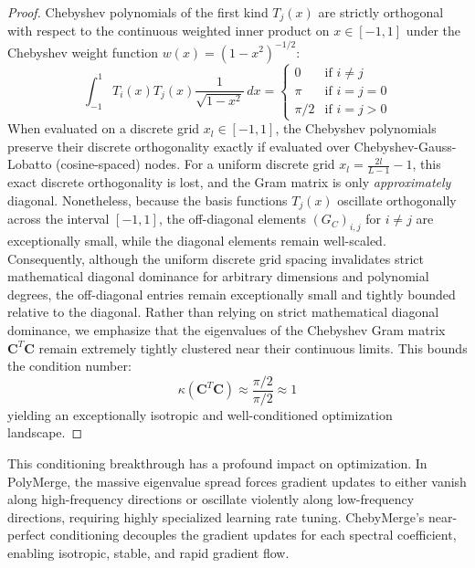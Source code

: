 \begin{proof}
Chebyshev polynomials of the first kind $T_j(x)$ are strictly orthogonal with respect to the continuous weighted inner product on $x \in [-1, 1]$ under the Chebyshev weight function $w(x) = (1 - x^2)^{-1/2}$:
\begin{equation}
\int_{-1}^1 T_i(x) T_j(x) \frac{1}{\sqrt{1-x^2}} \, dx = \begin{cases} 0 & \text{if } i \ne j \\ \pi & \text{if } i = j = 0 \\ \pi / 2 & \text{if } i = j > 0 \end{cases}
\end{equation}
When evaluated on a discrete grid $x_l \in [-1, 1]$, the Chebyshev polynomials preserve their discrete orthogonality exactly if evaluated over Chebyshev-Gauss-Lobatto (cosine-spaced) nodes. For a uniform discrete grid $x_l = \frac{2l}{L-1} - 1$, this exact discrete orthogonality is lost, and the Gram matrix is only \emph{approximately} diagonal. Nonetheless, because the basis functions $T_j(x)$ oscillate orthogonally across the interval $[-1, 1]$, the off-diagonal elements $(G_C)_{i, j}$ for $i \ne j$ are exceptionally small, while the diagonal elements remain well-scaled. Consequently, although the uniform discrete grid spacing invalidates strict mathematical diagonal dominance for arbitrary dimensions and polynomial degrees, the off-diagonal entries remain exceptionally small and tightly bounded relative to the diagonal. Rather than relying on strict mathematical diagonal dominance, we emphasize that the eigenvalues of the Chebyshev Gram matrix $\mathbf{C}^T \mathbf{C}$ remain extremely tightly clustered near their continuous limits. This bounds the condition number:
\begin{equation}
\kappa(\mathbf{C}^T \mathbf{C}) \approx \frac{\pi / 2}{\pi / 2} \approx 1
\end{equation}
yielding an exceptionally isotropic and well-conditioned optimization landscape.
\end{proof}

This conditioning breakthrough has a profound impact on optimization. In PolyMerge, the massive eigenvalue spread forces gradient updates to either vanish along high-frequency directions or oscillate violently along low-frequency directions, requiring highly specialized learning rate tuning. ChebyMerge's near-perfect conditioning decouples the gradient updates for each spectral coefficient, enabling isotropic, stable, and rapid gradient flow.

